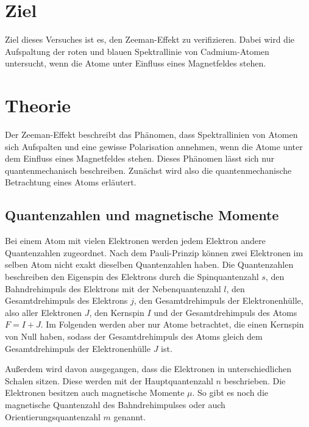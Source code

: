 \section{Ziel}
\label{sec:Ziel}
Ziel dieses Versuches ist es, den Zeeman-Effekt zu verifizieren. 
Dabei wird die Aufspaltung der roten und blauen Spektrallinie von Cadmium-Atomen untersucht, wenn
die Atome unter Einfluss eines Magnetfeldes stehen.

\section{Theorie}
\label{sec:Theorie}


Der Zeeman-Effekt beschreibt das Phänomen, dass Spektrallinien von Atomen sich Aufspalten und eine 
gewisse Polarisation annehmen, wenn die Atome unter dem Einfluss eines Magnetfeldes stehen. 
Dieses Phänomen lässt sich nur quantenmechanisch beschreiben. 
Zunächst wird also die quantenmechanische Betrachtung eines Atoms erläutert.


\subsection{Quantenzahlen und magnetische Momente}

Bei einem Atom mit vielen Elektronen werden jedem Elektron andere Quantenzahlen zugeordnet. Nach dem 
Pauli-Prinzip können zwei Elektronen im selben Atom nicht exakt dieselben Quantenzahlen haben. 
Die Quantenzahlen beschreiben den Eigenspin des Elektrons durch die Spinquantenzahl $s$, den Bahndrehimpuls 
des Elektrons mit der Nebenquantenzahl $l$, den 
Gesamtdrehimpuls des Elektrons $j$, den Gesamtdrehimpuls der Elektronenhülle, also aller Elektronen $J$, 
den Kernspin $I$ und der Gesamtdrehimpuls des Atoms $F = I + J$. Im Folgenden werden aber nur Atome 
betrachtet, die einen Kernspin von Null haben, sodass der Gesamtdrehimpuls des Atoms gleich dem 
Gesamtdrehimpuls der Elektronenhülle $J$ ist.

Außerdem wird davon ausgegangen, dass die Elektronen in unterschiedlichen Schalen sitzen. Diese werden 
mit der Hauptquantenzahl $n$ beschrieben.
Die Elektronen besitzen auch magnetische Momente $\mu$. So gibt es noch die magnetische Quantenzahl 
des Bahndrehimpulses oder auch Orientierungsquantenzahl $m$ genannt.

